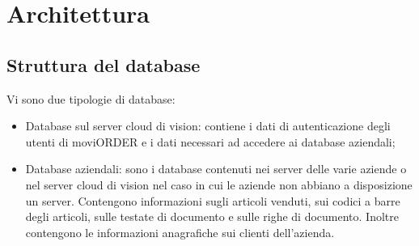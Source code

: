 \section{Architettura}
\label{architettura}

\subsection{Struttura del database}

Vi sono due tipologie di database:
\begin{itemize}
	\item Database sul server cloud di vision: contiene i dati di autenticazione degli utenti di moviORDER e i dati necessari ad accedere ai database aziendali;
	\item Database aziendali: sono i database contenuti nei server delle varie aziende o nel server cloud di vision nel caso in cui le aziende non abbiano a disposizione un server. Contengono informazioni sugli articoli venduti, sui codici a barre degli articoli, sulle testate di documento e sulle righe di documento. Inoltre contengono le informazioni anagrafiche sui clienti dell'azienda.
\end{itemize}

